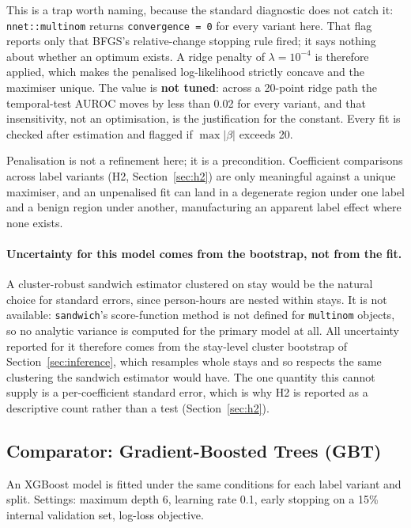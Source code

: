 This is a trap worth naming, because the standard diagnostic does not catch it:
\texttt{nnet::multinom} returns \texttt{convergence = 0} for every variant here.
That flag reports only that BFGS's relative-change stopping rule fired; it says
nothing about whether an optimum exists. A ridge penalty of
$\lambda = 10^{-4}$ is therefore applied, which makes the penalised
log-likelihood strictly concave and the maximiser unique. The value is
\textbf{not tuned}: across a 20-point ridge path the temporal-test AUROC moves
by less than 0.02 for every variant, and that insensitivity, not an
optimisation, is the justification for the constant. Every fit is checked
after estimation and flagged if $\max|\beta|$ exceeds 20.

Penalisation is not a refinement here; it is a precondition. Coefficient
comparisons across label variants (H2, Section~\ref{sec:h2}) are only meaningful
against a unique maximiser, and an unpenalised fit can land in a degenerate
region under one label and a benign region under another, manufacturing an
apparent label effect where none exists.

\paragraph{Uncertainty for this model comes from the bootstrap, not from the fit.}
A cluster-robust sandwich estimator clustered on stay would be the natural
choice for standard errors, since person-hours are nested within stays. It is
not available: \texttt{sandwich}'s score-function method is not defined for
\texttt{multinom} objects, so no analytic variance is computed for the primary
model at all. All uncertainty reported for it therefore comes from the
stay-level cluster bootstrap of Section~\ref{sec:inference}, which resamples
whole stays and so respects the same clustering the sandwich estimator would
have. The one quantity this cannot supply is a per-coefficient standard error,
which is why H2 is reported as a descriptive count rather than a test
(Section~\ref{sec:h2}).

\subsection{Comparator: Gradient-Boosted Trees (GBT)}

An XGBoost model is fitted under the same conditions for each label variant
and split. Settings: maximum depth 6, learning rate 0.1, early stopping on a
15\% internal validation set, log-loss objective.

